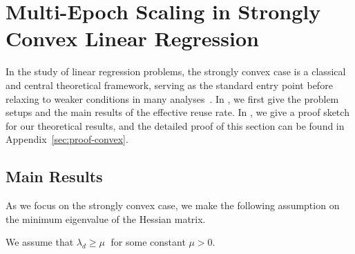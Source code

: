 \section{Multi-Epoch Scaling in Strongly Convex Linear Regression}
\label{sec:strongly_convex}
In the study of linear regression problems, the strongly convex case is a classical and central theoretical framework, serving as the standard entry point before relaxing to weaker conditions in many analyses~\citep{hastie2009elements,ge2019step}.
In , we first give the problem setups and the main results of the effective reuse rate. In , we give a proof sketch for our theoretical results, and the detailed proof of this section can be found in Appendix~\ref{sec:proof-convex}. 

\vspace{-0.07in}
\subsection{Main Results}\label{sec: main results strongly convex}

As we focus on the strongly convex case, we make the following assumption on the minimum eigenvalue of the Hessian matrix.
\begin{assumption}\label{asp:strongly-convex}
    We assume that $\lambda_{d} \ge \mu\;$ for some constant $\mu > 0$.
\end{assumption}

